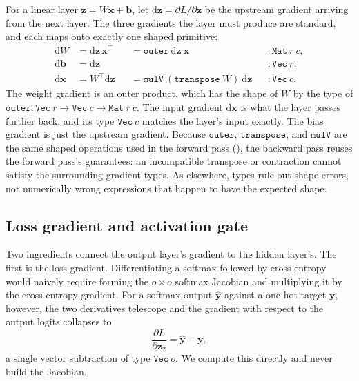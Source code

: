 \documentclass[sigconf,nonacm]{acmart}
\begin{document}
For a linear layer \(\mathbf{z} = W\mathbf{x} + \mathbf{b}\), let
\(\mathrm{d}\mathbf{z} = \partial L / \partial \mathbf{z}\) be the upstream
gradient arriving from the next layer. The three gradients the layer must
produce are standard, and each maps onto exactly one shaped primitive:
\begin{align}
  \mathrm{d}W        &= \mathrm{d}\mathbf{z}\,\mathbf{x}^{\top}
    && = \mathtt{outer}\ \mathrm{d}\mathbf{z}\ \mathbf{x}
    && : \mathtt{Mat}\ r\ c, \\
  \mathrm{d}\mathbf{b} &= \mathrm{d}\mathbf{z}
    && &&: \mathtt{Vec}\ r, \\
  \mathrm{d}\mathbf{x} &= W^{\top}\mathrm{d}\mathbf{z}
    && = \mathtt{mulV}\ (\mathtt{transpose}\ W)\ \mathrm{d}\mathbf{z}
    && : \mathtt{Vec}\ c.
\end{align}
The weight gradient is an outer product, which has the shape of \(W\) by the
type of \(\mathtt{outer} : \mathtt{Vec}\ r \to \mathtt{Vec}\ c \to
\mathtt{Mat}\ r\ c\). The input gradient \(\mathrm{d}\mathbf{x}\) is what the
layer passes further back, and its type \(\mathtt{Vec}\ c\) matches the layer's
input exactly. The bias gradient is just the upstream gradient. Because
\(\mathtt{outer}\), \(\mathtt{transpose}\), and \(\mathtt{mulV}\) are the same
shaped operations used in the forward pass (), the
backward pass reuses the forward pass's guarantees: an incompatible transpose
or contraction cannot satisfy the surrounding gradient types. As elsewhere,
types rule out shape errors, not numerically wrong expressions that happen to
have the expected shape.

\subsection{Loss gradient and activation gate}
\label{sec:bp:loss}

Two ingredients connect the output layer's gradient to the hidden layer's. The
first is the loss gradient. Differentiating a softmax followed by cross-entropy
would naively require forming the \(o \times o\) softmax Jacobian and
multiplying it by the cross-entropy gradient. For a softmax output
\(\hat{\mathbf{y}}\) against a one-hot target \(\mathbf{y}\), however, the two
derivatives telescope and the gradient with respect to the output logits
collapses to
\[
  \frac{\partial L}{\partial \mathbf{z}_2} = \hat{\mathbf{y}} - \mathbf{y},
\]
a single vector subtraction of type \(\mathtt{Vec}\ o\). We compute this directly
and never build the Jacobian.
\end{document}
